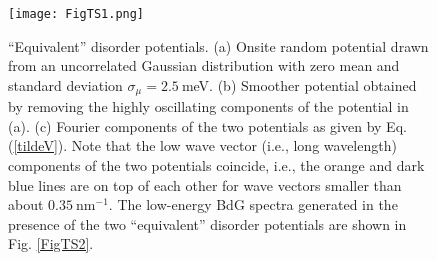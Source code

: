 \documentclass[aps,prmaterials,twocolumn,superscriptaddress,longbibliography]{revtex4-2}
\begin{document}
\begin{figure}[t]
\begin{center}
\texttt{[image: FigTS1.png]}
\end{center}
\vspace{-3mm}
\caption{``Equivalent'' disorder potentials. (a) Onsite random potential drawn from an uncorrelated Gaussian distribution with zero mean and standard deviation $\sigma_\mu = 2.5~$meV. (b) Smoother potential obtained by removing the highly oscillating components of the potential in (a). (c) Fourier components of the two potentials as given by Eq. (\ref{tildeV}). Note that the low wave vector (i.e., long wavelength) components of the two potentials coincide, i.e., the orange and dark blue lines are on top of each other for wave vectors smaller than about $0.35~$nm$^{-1}$. The low-energy BdG spectra generated in the presence of the two ``equivalent'' disorder potentials are shown in Fig. \ref{FigTS2}.}
\label{FigTS1}
\vspace{-1mm}
\end{figure}
\end{document}
